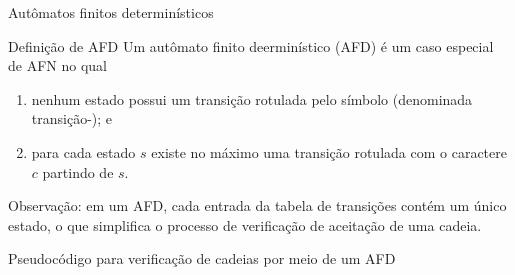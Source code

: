 \begin{frame}[fragile]{Autômatos finitos determinísticos}

    \begin{block}{Definição de AFD}
        Um autômato finito deerminístico (AFD) é um caso especial de AFN no qual
        \begin{enumerate}
            \item nenhum estado possui um transição rotulada pelo símbolo  (denominada transição-); e
            \item para cada estado $s$ existe no máximo uma transição rotulada com o caractere $c$ partindo de $s$.
        \end{enumerate}
    \end{block}

    \vspace{0.2in}

    Observação: em um AFD, cada entrada da tabela de transições contém um único estado, o que simplifica o processo de verificação de aceitação de uma cadeia.
\end{frame}

\begin{frame}[fragile]{Pseudocódigo para verificação de cadeias por meio de um AFD}

    \begin{algorithmic}[1]
        \vspace{0.2in}
        \Statex
        \EndWhile
        \Statex
            \State {}
        \Else
            \State {}
        \EndIf
    \end{algorithmic}

\end{frame}
